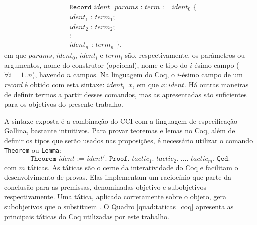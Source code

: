 \begin{align*}
&\texttt{Record $ident$ $params$ : $term$ := $ident_0$ \{}\\
&\texttt{$ident_1$ : $term_1$;}\\
&\texttt{$ident_2$ : $term_2$;}\\
&\vdots\\
&\texttt{$ident_n$ : $term_n$ \}.}
\end{align*} em que $params$, $ident_0$, $ident_i$ e $term_i$ são, respectivamente, os parâmetros ou argumentos, nome do construtor (opcional), nome e tipo do $i$-ésimo campo ($\forall i = 1..n$), havendo $n$ campos. Na linguagem do Coq, o $i$-ésimo campo de um \textit{record} é obtido com esta sintaxe: \texttt{$ident_i$ $x$}, em que $x : ident$. Há outras maneiras de definir termos a partir desses comandos, mas as apresentadas são suficientes para os objetivos do presente trabalho.

A sintaxe exposta é a combinação do CCI com a linguagem de especificação Gallina, bastante intuitivos. Para provar teoremas e lemas no Coq, além de definir os tipos que serão usados nas proposições, é necessário utilizar o comando \texttt{Theorem} ou \texttt{Lemma}: $$\texttt{Theorem $ident$ := $ident'$. Proof. $tactic_1$. $tactic_2$. $...$. $tactic_m$. Qed.}$$ com $m$ táticas. As táticas são o cerne da interatividade do Coq e facilitam o desenvolvimento de provas. Elas implementam um raciocínio que parte da conclusão para as premissas, denominadas objetivo e subobjetivos respectivamente. Uma tática, aplicada corretamente sobre o objeto, gera subobjetivos que o substituem \cite{manualcoq}. O Quadro \ref{quad:taticas_coq} apresenta as principais táticas do Coq utilizadas por este trabalho.


